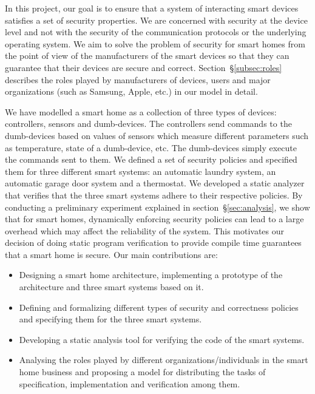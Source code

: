 \documentclass{article}
\begin{document}
In this project, our goal is to ensure that a system of interacting smart devices satisfies a set of security properties. We are concerned with security at the device level and not with the security of the communication protocols or the underlying operating system. We aim to solve the problem of security for smart homes from the point of view of the manufacturers of the smart devices so that they can guarantee that their devices are secure and correct. Section~\S\ref{subsec:roles} describes the roles played by manufacturers of devices, users and major organizations (such as Samsung, Apple, etc.) in our model in detail.

We have modelled a smart home as a collection of three types of devices: controllers, sensors and dumb-devices. The controllers send commands to the dumb-devices based on values of sensors which measure different parameters such as temperature, state of a dumb-device, etc. The dumb-devices simply execute the commands sent to them.
We defined a set of security policies and specified them for three different smart systems: an automatic laundry system, an automatic garage door system and a thermostat. We developed a static analyzer that verifies that the three smart systems adhere to their respective policies. By conducting a preliminary experiment explained in section~\S\ref{sec:analysis}, we show that for smart homes, dynamically enforcing security policies can lead to a large overhead which may affect the reliability of the system. This motivates our decision of doing static program verification to provide compile time guarantees that a smart home is secure. Our main contributions are:
\begin{itemize}[topsep=0pt,itemsep=0ex,partopsep=1ex,parsep=1ex]
    \item Designing a smart home architecture, implementing a prototype of the architecture and three smart systems based on it.    
    \item Defining and formalizing different types of security and correctness policies and specifying them for the three smart systems.
    \item Developing a static analysis tool for verifying the code of the smart systems.
    \item Analysing the roles played by different organizations/individuals in the smart home business and proposing a model for distributing the tasks of specification, implementation and verification among them.
\end{itemize}
  
\end{document}
